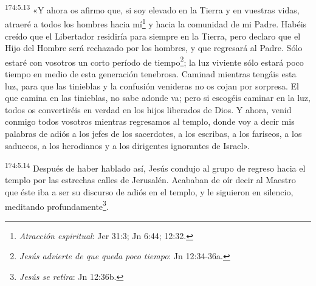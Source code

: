 \par
\textsuperscript{174:5.13} «Y ahora os afirmo que, si soy elevado en la Tierra y en vuestras vidas, atraeré a todos los hombres hacia mí\footnote{\textit{Atracción espiritual}: Jer 31:3; Jn 6:44; 12:32.} y hacia la comunidad de mi Padre. Habéis creído que el Libertador residiría para siempre en la Tierra, pero declaro que el Hijo del Hombre será rechazado por los hombres, y que regresará al Padre. Sólo estaré con vosotros un corto período de tiempo\footnote{\textit{Jesús advierte de que queda poco tiempo}: Jn 12:34-36a.}; la luz viviente sólo estará poco tiempo en medio de esta generación tenebrosa. Caminad mientras tengáis esta luz, para que las tinieblas y la confusión venideras no os cojan por sorpresa. El que camina en las tinieblas, no sabe adonde va; pero si escogéis caminar en la luz, todos os convertiréis en verdad en los hijos liberados de Dios. Y ahora, venid conmigo todos vosotros mientras regresamos al templo, donde voy a decir mis palabras de adiós a los jefes de los sacerdotes, a los escribas, a los fariseos, a los saduceos, a los herodianos y a los dirigentes ignorantes de Israel».

\par
\textsuperscript{174:5.14} Después de haber hablado así, Jesús condujo al grupo de regreso hacia el templo por las estrechas calles de Jerusalén. Acababan de oír decir al Maestro que éste iba a ser su discurso de adiós en el templo, y le siguieron en silencio, meditando profundamente\footnote{\textit{Jesús se retira}: Jn 12:36b.}.